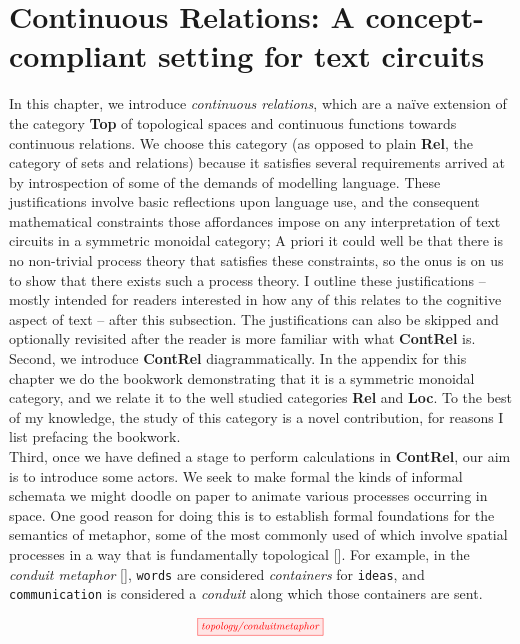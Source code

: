 \section{Continuous Relations: A concept-compliant setting for text circuits}

In this chapter, we introduce \emph{continuous relations}, which are a na\"{i}ve extension of the category \textbf{Top} of topological spaces and continuous functions towards continuous relations. We choose this category (as opposed to plain \textbf{Rel}, the category of sets and relations) because it satisfies several requirements arrived at by introspection of some of the demands of modelling language. These justifications involve basic reflections upon language use, and the consequent mathematical constraints those affordances impose on any interpretation of text circuits in a symmetric monoidal category; A priori it could well be that there is no non-trivial process theory that satisfies these constraints, so the onus is on us to show that there exists such a process theory. I outline these justifications -- mostly intended for readers interested in how any of this relates to the cognitive aspect of text -- after this subsection. The justifications can also be skipped and optionally revisited after the reader is more familiar with what \textbf{ContRel} is.\\

Second, we introduce \textbf{ContRel} diagrammatically. In the appendix for this chapter we do the bookwork demonstrating that it is a symmetric monoidal category, and we relate it to the well studied categories \textbf{Rel} and \textbf{Loc}. To the best of my knowledge, the study of this category is a novel contribution, for reasons I list prefacing the bookwork.\\

Third, once we have defined a stage to perform calculations in \textbf{ContRel}, our aim is to introduce some actors. We seek to make formal the kinds of informal schemata we might doodle on paper to animate various processes occurring in space. One good reason for doing this is to establish formal foundations for the semantics of metaphor, some of the most commonly used of which involve spatial processes in a way that is fundamentally topological []. For example, in the \emph{conduit metaphor} [], \texttt{words} are considered \emph{containers} for \texttt{ideas}, and \texttt{communication} is considered a \emph{conduit} along which those containers are sent.

\[\scalebox{0.75}{\tikzfig{topology/conduitmetaphor}}\]

